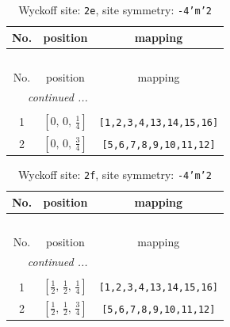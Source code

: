 \documentclass[fleqn,8pt]{jsarticle}
\begin{document}
\begin{longtable}{ccc}
\caption{Wyckoff site: {\tt 2e}, site symmetry: {\tt -4'm'2}}
 \\
 \hline \hline
No. & position & mapping \\ \hline \endfirsthead

\multicolumn{2}{l}{\tablename\ \thetable{}} \\
 \hline \hline
No. & position & mapping \\ \hline \endhead

 \hline \hline
\multicolumn{2}{r}{\footnotesize\it continued ...} \\ \endfoot

 \hline \hline
\multicolumn{2}{r}{} \\ \endlastfoot

1 & $\left[ 0,\, 0,\, \frac{1}{4} \right]$ & {\tt [1,2,3,4,13,14,15,16]} \\ \hline
2 & $\left[ 0,\, 0,\, \frac{3}{4} \right]$ & {\tt [5,6,7,8,9,10,11,12]} \\
\end{longtable}
\renewcommand{\arraystretch}{1.2}
\begin{longtable}{ccc}
\caption{Wyckoff site: {\tt 2f}, site symmetry: {\tt -4'm'2}}
 \\
 \hline \hline
No. & position & mapping \\ \hline \endfirsthead

\multicolumn{2}{l}{\tablename\ \thetable{}} \\
 \hline \hline
No. & position & mapping \\ \hline \endhead

 \hline \hline
\multicolumn{2}{r}{\footnotesize\it continued ...} \\ \endfoot

 \hline \hline
\multicolumn{2}{r}{} \\ \endlastfoot

1 & $\left[ \frac{1}{2},\, \frac{1}{2},\, \frac{1}{4} \right]$ & {\tt [1,2,3,4,13,14,15,16]} \\ \hline
2 & $\left[ \frac{1}{2},\, \frac{1}{2},\, \frac{3}{4} \right]$ & {\tt [5,6,7,8,9,10,11,12]} \\
\end{longtable}
\renewcommand{\arraystretch}{1.2}
\end{document}
